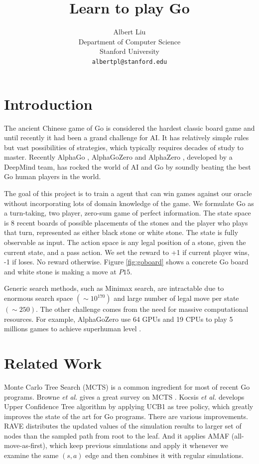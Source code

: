 \documentclass{article}
\title{Learn to play Go}
\author{%
  Albert Liu \\
  Department of Computer Science\\
  Stanford University\\
  \texttt{albertpl@stanford.edu} \\
}
\begin{document}
\maketitle

\section{Introduction}

The ancient Chinese game of Go is considered the hardest classic board game and until recently it had been a grand challenge for AI. It has relatively simple rules but vast possibilities of strategies, which typically requires decades of study to master.  Recently AlphaGo \cite{silver2016mastering}, AlphaGoZero \cite{silver2017masteringalphagozero} and AlphaZero \cite{silver2017masteringalphazero}, developed by a DeepMind team, has rocked the world of AI and Go by soundly beating the best Go human players in the world.

The goal of this project is to train a agent that can win games against our oracle without incorporating lots of domain knowledge of the game. We formulate Go as a turn-taking, two player, zero-sum game of perfect information. The state space is 8 recent boards of possible placements of the stones and the player who plays that turn, represented as either black stone or white stone. The state is fully observable as input. The action space is any legal position of a stone, given the current state, and a pass action. We set the reward to +1 if current player wins, -1 if loses. No reward otherwise. Figure \ref{fig:goboard} shows a concrete Go board and white stone is making a move at $P15$. 

Generic search methods, such as Minimax search, are intractable due to enormous search space $(\sim 10^{170})$ and large number of legal move per state$(\sim 250)$. The other challenge comes from the need for massive computational resources. For example, AlphaGoZero use 64 GPUs and 19 CPUs to play 5 millions games to achieve superhuman level \cite{silver2017masteringalphagozero}.

\section{Related Work}
Monte Carlo Tree Search (MCTS) is a common ingredient for most of recent Go programs. Browne \textit{et al.} gives a great survey on MCTS \cite{browne2012survey}. Kocsis \textit{et al.} develops Upper Confidence Tree \cite{kocsis2006bandit} algorithm by applying UCB1 \cite{auer2002finite} as tree policy, which greatly improves the state of the art for Go programs. There are various improvements. RAVE \cite{gelly2007combining} distributes the updated values of the simulation results to larger set of nodes than the sampled path from root to the leaf. And it applies AMAF \cite{bouzy2004monte} (all-move-as-first), which keep previous simulations and apply it whenever we examine the same $(s, a)$ edge and then combines it with regular simulations.
\end{document}
